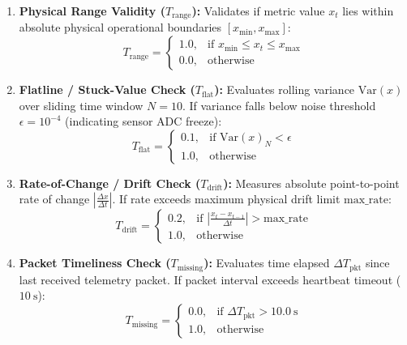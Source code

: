 \documentclass[conference]{IEEEtran}
\begin{document}
\begin{enumerate}
    \item \textbf{Physical Range Validity ($T_{\text{range}}$):} Validates if metric value $x_t$ lies within absolute physical operational boundaries $[x_{\min}, x_{\max}]$:
    \begin{equation}
    T_{\text{range}} = 
    \begin{cases} 
    1.0, & \text{if } x_{\min} \le x_t \le x_{\max} \\
    0.0, & \text{otherwise}
    \end{cases}
    \end{equation}
    
    \item \textbf{Flatline / Stuck-Value Check ($T_{\text{flat}}$):} Evaluates rolling variance $\text{Var}(x)$ over sliding time window $N=10$. If variance falls below noise threshold $\epsilon=10^{-4}$ (indicating sensor ADC freeze):
    \begin{equation}
    T_{\text{flat}} = 
    \begin{cases} 
    0.1, & \text{if } \text{Var}(x)_{N} < \epsilon \\
    1.0, & \text{otherwise}
    \end{cases}
    \end{equation}
    
    \item \textbf{Rate-of-Change / Drift Check ($T_{\text{drift}}$):} Measures absolute point-to-point rate of change $\left|\frac{\Delta x}{\Delta t}\right|$. If rate exceeds maximum physical drift limit $\text{max\_rate}$:
    \begin{equation}
    T_{\text{drift}} = 
    \begin{cases} 
    0.2, & \text{if } \left|\frac{x_t - x_{t-1}}{\Delta t}\right| > \text{max\_rate} \\
    1.0, & \text{otherwise}
    \end{cases}
    \end{equation}
    
    \item \textbf{Packet Timeliness Check ($T_{\text{missing}}$):} Evaluates time elapsed $\Delta T_{\text{pkt}}$ since last received telemetry packet. If packet interval exceeds heartbeat timeout ($10~\text{s}$):
    \begin{equation}
    T_{\text{missing}} = 
    \begin{cases} 
    0.0, & \text{if } \Delta T_{\text{pkt}} > 10.0~\text{s} \\
    1.0, & \text{otherwise}
    \end{cases}
    \end{equation}
\end{enumerate}
\end{document}
